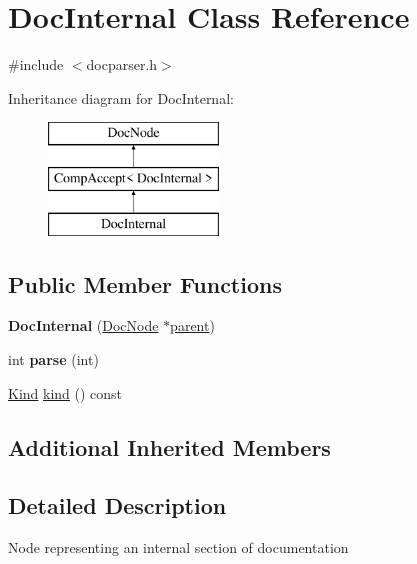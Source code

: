 \hypertarget{class_doc_internal}{}\section{Doc\+Internal Class Reference}
\label{class_doc_internal}


{\ttfamily \#include $<$docparser.\+h$>$}

Inheritance diagram for Doc\+Internal\+:\begin{figure}[H]
\begin{center}
\leavevmode
\includegraphics[height=3.000000cm]{class_doc_internal}
\end{center}
\end{figure}
\subsection*{Public Member Functions}
\begin{DoxyCompactItemize}
\item 
\mbox{\label{class_doc_internal_aaf39e5b4e9c6aeef48f90e51ef94b342}} 
{\bfseries Doc\+Internal} (\mbox{\hyperlink{class_doc_node}{Doc\+Node}} $\ast$\mbox{\hyperlink{class_doc_node_a73e8ad29a91cfceb0968eb00db71a23d}{parent}})
\item 
\mbox{\label{class_doc_internal_ab88dfb2d7c445158de27b3738358a92d}} 
int {\bfseries parse} (int)
\item 
\mbox{\hyperlink{class_doc_node_aebd16e89ca590d84cbd40543ea5faadb}{Kind}} \mbox{\hyperlink{class_doc_internal_a1d493c47fa2ced4e56f8288c96939a99}{kind}} () const
\end{DoxyCompactItemize}
\subsection*{Additional Inherited Members}


\subsection{Detailed Description}
Node representing an internal section of documentation 

